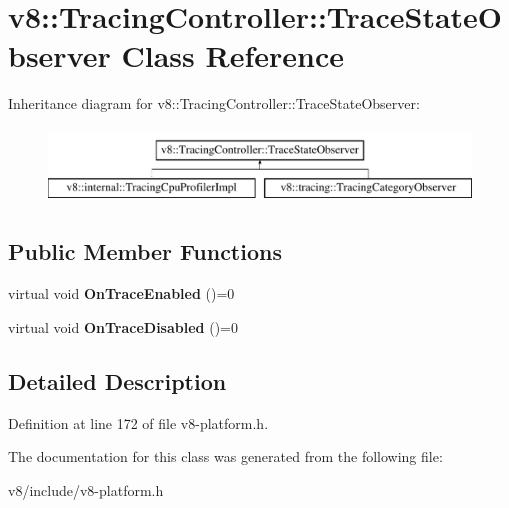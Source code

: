 \hypertarget{classv8_1_1TracingController_1_1TraceStateObserver}{}\section{v8\+:\+:Tracing\+Controller\+:\+:Trace\+State\+Observer Class Reference}
\label{classv8_1_1TracingController_1_1TraceStateObserver}
Inheritance diagram for v8\+:\+:Tracing\+Controller\+:\+:Trace\+State\+Observer\+:\begin{figure}[H]
\begin{center}
\leavevmode
\includegraphics[height=2.000000cm]{classv8_1_1TracingController_1_1TraceStateObserver}
\end{center}
\end{figure}
\subsection*{Public Member Functions}
\begin{DoxyCompactItemize}
\item 
\mbox{\label{classv8_1_1TracingController_1_1TraceStateObserver_a3853d90b9458529203fd1c4bc8caf4e3}} 
virtual void {\bfseries On\+Trace\+Enabled} ()=0
\item 
\mbox{\label{classv8_1_1TracingController_1_1TraceStateObserver_a840a68c822844e57e4b023dc4f9e0fee}} 
virtual void {\bfseries On\+Trace\+Disabled} ()=0
\end{DoxyCompactItemize}


\subsection{Detailed Description}


Definition at line 172 of file v8-\/platform.\+h.



The documentation for this class was generated from the following file\+:\begin{DoxyCompactItemize}
\item 
v8/include/v8-\/platform.\+h\end{DoxyCompactItemize}
